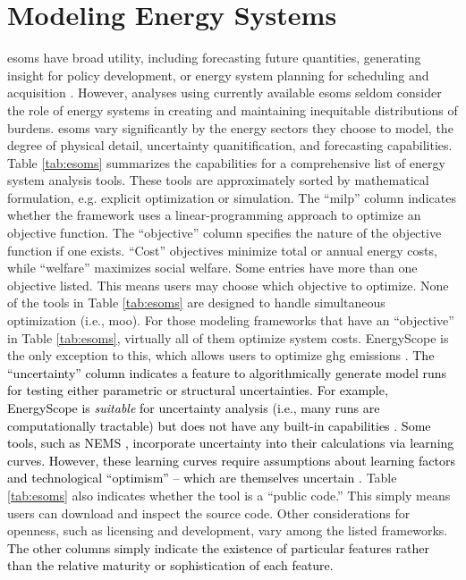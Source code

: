 \section{Modeling Energy Systems}
\label{section:esoms}

\Acp{esom} have broad utility, including forecasting future quantities,
generating insight for policy development, or energy system planning for
scheduling and acquisition \cite{decarolis_using_2011, yue_review_2018}.
However, analyses using currently available \acp{esom} seldom consider the role
of energy systems in creating and maintaining inequitable distributions of
burdens. \acp{esom} vary significantly by the energy sectors they choose to
model, the degree of physical detail, uncertainty quanitification, and
forecasting capabilities. Table \ref{tab:esoms} summarizes the capabilities for
a comprehensive list of energy system analysis tools. These tools are
approximately sorted by mathematical formulation, e.g. explicit optimization or
simulation. The ``\ac{milp}'' column indicates whether the framework uses a
linear-programming approach to optimize an objective function. The ``objective''
column specifies the nature of the objective function if one exists. ``Cost''
objectives minimize total or annual energy costs, while ``welfare'' maximizes
social welfare. Some entries have more than one objective listed. This means
users may choose which objective to optimize. None of the tools in Table
\ref{tab:esoms} are designed to handle simultaneous optimization (i.e.,
\ac{moo}). For those modeling frameworks that have an ``objective'' in Table
\ref{tab:esoms}, virtually all of them optimize system costs. EnergyScope is the
only exception to this, which allows users to optimize \ac{ghg} emissions
\cite{limpens_energyscope_2019}. \textcolor{black}{The ``uncertainty'' column
indicates a feature to algorithmically generate model runs for testing either
parametric or structural uncertainties. \textcolor{black}{For example,
EnergyScope is \textit{suitable} for uncertainty analysis (i.e., many runs are
computationally tractable) but does not have any built-in capabilities
\cite{limpens_energyscope_2019}.} Some tools, such as NEMS
\cite{nalley_national_2019}, incorporate uncertainty into their calculations via
learning curves. However, these learning curves require assumptions about
learning factors and technological ``optimism'' --  which are themselves
uncertain \cite{nalley_national_2019}.} Table \ref{tab:esoms} also indicates
whether the tool is a ``public code.'' This simply means users can download and
inspect the source code. Other considerations for openness, such as licensing
and development, vary among the listed frameworks. \textcolor{black}{The other
columns simply indicate the existence of particular features rather than the
relative maturity or sophistication of each feature.} 

